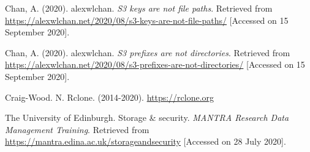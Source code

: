 \documentclass[12pt,a4paper,oneside]{report}
\begin{document}
Chan, A. (2020). alexwlchan. \emph{S3 keys are not file paths}.
Retrieved from
\url{https://alexwlchan.net/2020/08/s3-keys-are-not-file-paths/}
{[}Accessed on 15 September 2020{]}.

Chan, A. (2020). alexwlchan. \emph{S3 prefixes are not directories}.
Retrieved from
\url{https://alexwlchan.net/2020/08/s3-prefixes-are-not-directories/}
{[}Accessed on 15 September 2020{]}.

Craig-Wood. N. Rclone. (2014-2020). \url{https://rclone.org}

The University of Edinburgh. Storage \& security. \emph{MANTRA Research
Data Management Training}. Retrieved from
\url{https://mantra.edina.ac.uk/storageandsecurity} {[}Accessed on 28
July 2020{]}.
\end{document}

